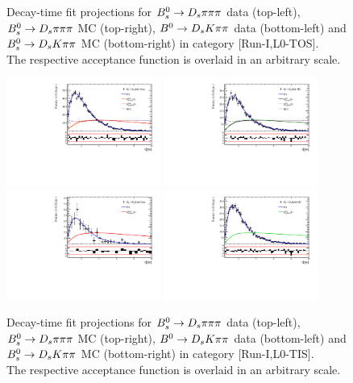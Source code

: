 \begin{figure}[h]
\caption{
\footnotesize Decay-time fit projections for 
${{B}^0_{s}}\rightarrow{\ensuremath{{D}_{s}}}{\ensuremath{\pi}}{\ensuremath{\pi}}{\ensuremath{\pi}}$ data (top-left), ${{B}^0_{s}}\rightarrow{\ensuremath{{D}_{s}}}{\ensuremath{\pi}}{\ensuremath{\pi}}{\ensuremath{\pi}}$ MC (top-right), ${{B}^0}\rightarrow{\ensuremath{{D}_{s}}}{\ensuremath{K}}{\ensuremath{\pi}}{\ensuremath{\pi}}$ data (bottom-left) 
and ${{B}^0_{s}}\rightarrow{\ensuremath{{D}_{s}}}{\ensuremath{K}}{\ensuremath{\pi}}{\ensuremath{\pi}}$ MC (bottom-right)  
in category [\textsf{Run-I},\textsf{L0-TOS}]. \\
The respective acceptance function is overlaid in an arbitrary scale.
 }
\label{fig:accFit}
\includegraphics[height=!,width=0.45\textwidth]{figs/Acceptance/adaptive_N4/timeAccRatioFit_norm_Run1_t1.pdf}
\includegraphics[height=!,width=0.45\textwidth]{figs/Acceptance/adaptive_N4/timeAccRatioFit_norm_mc_Run1_t1.pdf}
\includegraphics[height=!,width=0.45\textwidth]{figs/Acceptance/adaptive_N4/timeAccRatioFit_signal_B0_Run1_t1.pdf}
\includegraphics[height=!,width=0.45\textwidth]{figs/Acceptance/adaptive_N4/timeAccRatioFit_signal_mc_Run1_t1.pdf}
\caption{
\footnotesize Decay-time fit projections for 
${{B}^0_{s}}\rightarrow{\ensuremath{{D}_{s}}}{\ensuremath{\pi}}{\ensuremath{\pi}}{\ensuremath{\pi}}$ data (top-left), ${{B}^0_{s}}\rightarrow{\ensuremath{{D}_{s}}}{\ensuremath{\pi}}{\ensuremath{\pi}}{\ensuremath{\pi}}$ MC (top-right), ${{B}^0}\rightarrow{\ensuremath{{D}_{s}}}{\ensuremath{K}}{\ensuremath{\pi}}{\ensuremath{\pi}}$ data (bottom-left) 
and ${{B}^0_{s}}\rightarrow{\ensuremath{{D}_{s}}}{\ensuremath{K}}{\ensuremath{\pi}}{\ensuremath{\pi}}$ MC (bottom-right)  
in category [\textsf{Run-I},\textsf{L0-TIS}]. \\
The respective acceptance function is overlaid in an arbitrary scale.
 }\label{fig:accFit2}
\end{figure}

